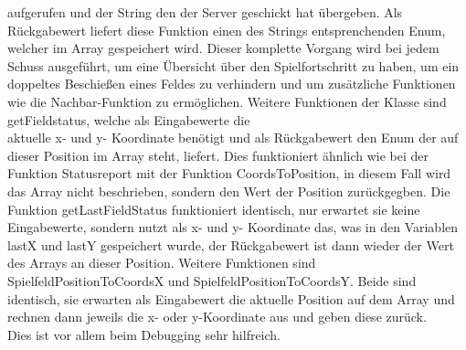 aufgerufen und der String den der Server geschickt hat übergeben. Als Rückgabewert liefert diese Funktion einen des Strings entsprenchenden Enum, welcher im Array gespeichert wird. 
Dieser komplette Vorgang wird bei jedem Schuss ausgeführt, um eine Übersicht über den Spielfortschritt zu haben, um ein doppeltes Beschießen eines Feldes zu verhindern und um 
zusätzliche Funktionen wie die Nachbar-Funktion zu ermöglichen. Weitere Funktionen der Klasse sind getFieldstatus, welche als Eingabewerte die \\aktuelle x- und y- Koordinate benötigt 
und als Rückgabewert den Enum der auf dieser Position im Array steht, liefert. Dies funktioniert ähnlich wie bei der Funktion Statusreport mit der Funktion CoordsToPosition, in diesem 
Fall wird das Array nicht beschrieben, sondern den Wert der Position zurückgegben. Die Funktion getLastFieldStatus funktioniert identisch, nur erwartet sie keine Eingabewerte, sondern 
nutzt als x- und y- Koordinate das, was in den Variablen lastX und lastY gespeichert wurde, der Rückgabewert ist dann wieder der Wert des Arrays an dieser Position. Weitere Funktionen 
sind SpielfeldPositionToCoordsX und SpielfeldPositionToCoordsY. Beide sind identisch, sie erwarten als Eingabewert die aktuelle Position auf dem Array und rechnen dann jeweils die x- 
oder y-Koordinate aus und geben diese zurück. \\Dies ist vor allem beim Debugging sehr hilfreich.


